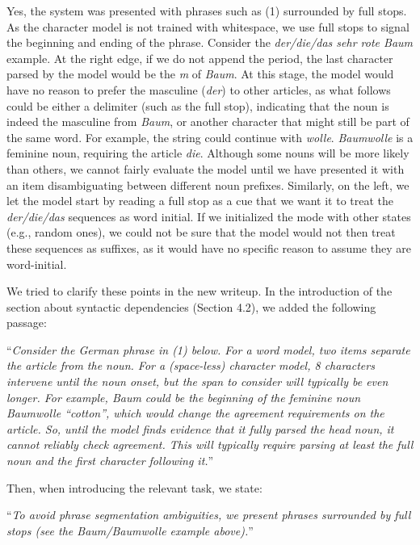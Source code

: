 \documentclass{article}
\begin{document}
Yes, the system was presented with phrases such as (1) surrounded by full stops. As the character model is not trained with whitespace, we use full stops to signal the beginning and ending of the phrase. Consider the \textit{der/die/das sehr rote Baum} example. At the right edge, if we do not append the period, the last character parsed by the model would be the \textit{m} of \textit{Baum}. At this stage, the model would have no reason to prefer the masculine (\textit{der}) to other articles, as what follows could be either a delimiter (such as the full stop), indicating that the noun is indeed the masculine from \textit{Baum}, or another character that might still be part of the same word. For example, the string could continue with \textit{wolle}. \textit{Baumwolle} is a feminine noun, requiring the article \textit{die}. Although some nouns will be more likely than others, we cannot fairly evaluate the model until we have presented it with an item disambiguating between different noun prefixes. Similarly, on the left, we let the model start by reading a full stop as a cue that we want it to treat the \textit{der/die/das} sequences as word initial. If we initialized the mode with other states (e.g., random ones), we could not be sure that the model would not then treat these sequences as suffixes, as it would have no specific reason to assume they are word-initial.

We tried to clarify these points in the new writeup. In the introduction of the section about syntactic dependencies (Section 4.2), we added the following passage:

``\textit{Consider the German phrase in (1) below. For a word model, two items separate the article from the noun. For a (space-less) character model, 8 characters intervene until the noun onset, but the span to consider will typically be even longer. For example, \emph{Baum} could be the beginning of the feminine noun \emph{Baumwolle} ``cotton'', which would change the agreement requirements on the article. So, until the model finds evidence that it fully parsed the head noun, it cannot reliably check agreement. This will typically require parsing at least the full noun and the first character following it.}''

Then, when introducing the relevant task, we state:

``\textit{To avoid phrase segmentation ambiguities, we present phrases surrounded by full stops (see the \emph{Baum}/\emph{Baumwolle} example above).}''
\newline
\end{document}
